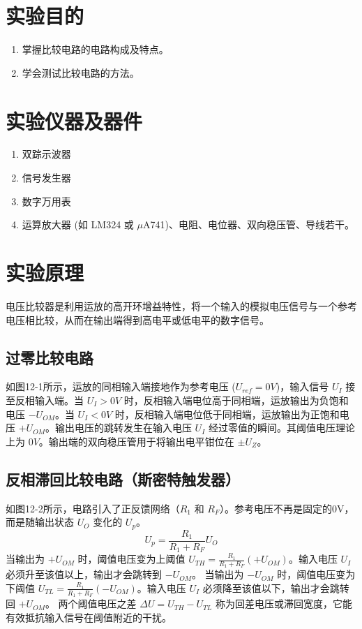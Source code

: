 \documentclass[a4paper]{ctexart}
\begin{document}

\section{实验目的}
\begin{enumerate}
    \item 掌握比较电路的电路构成及特点。
    \item 学会测试比较电路的方法。
\end{enumerate}

\section{实验仪器及器件}
\begin{enumerate}
    \item 双踪示波器
    \item 信号发生器
    \item 数字万用表
    \item 运算放大器 (如 LM324 或 $\mu$A741)、电阻、电位器、双向稳压管、导线若干。
\end{enumerate}

\section{实验原理}
电压比较器是利用运放的高开环增益特性，将一个输入的模拟电压信号与一个参考电压相比较，从而在输出端得到高电平或低电平的数字信号。
\subsection{过零比较电路}
如图12-1所示，运放的同相输入端接地作为参考电压 ($U_{ref}=0V$)，输入信号 $U_I$ 接至反相输入端。当 $U_I > 0V$ 时，反相输入端电位高于同相端，运放输出为负饱和电压 $-U_{OM}$。当 $U_I < 0V$ 时，反相输入端电位低于同相端，运放输出为正饱和电压 $+U_{OM}$。输出电压的跳转发生在输入电压 $U_I$ 经过零值的瞬间。其阈值电压理论上为 $0V$。输出端的双向稳压管用于将输出电平钳位在 $\pm U_Z$。

\subsection{反相滞回比较电路（斯密特触发器）}
如图12-2所示，电路引入了正反馈网络（$R_1$ 和 $R_F$）。参考电压不再是固定的0V，而是随输出状态 $U_O$ 变化的 $U_p$。
$$ U_p = \frac{R_1}{R_1 + R_F} U_O $$
当输出为 $+U_{OM}$ 时，阈值电压变为上阈值 $U_{TH} = \frac{R_1}{R_1 + R_F} (+U_{OM})$。输入电压 $U_I$ 必须升至该值以上，输出才会跳转到 $-U_{OM}$。
当输出为 $-U_{OM}$ 时，阈值电压变为下阈值 $U_{TL} = \frac{R_1}{R_1 + R_F} (-U_{OM})$。输入电压 $U_I$ 必须降至该值以下，输出才会跳转回 $+U_{OM}$。
两个阈值电压之差 $\Delta U = U_{TH} - U_{TL}$ 称为回差电压或滞回宽度，它能有效抵抗输入信号在阈值附近的干扰。
\end{document}

